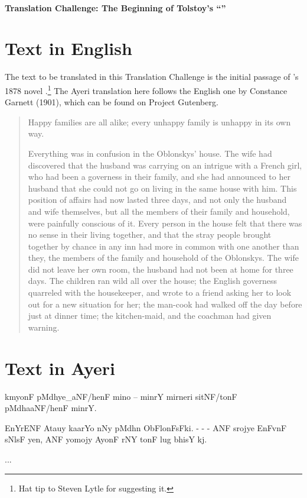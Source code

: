 \documentclass[12pt,paper=letter]{scrartcl}
\newcommand{\q}[1]{\enquote{#1}} %
\newenvironment{ayeri}{\begin{multicols}{2} \Tagati}{\end{multicols} \par}
\newenvironment{mytitle}{\begin{center} \Large \sffamily\bfseries ~\\}{\end{center}}
\begin{document}

\begin{mytitle}
    Translation Challenge: The Beginning of Tolstoy's \q{}
\end{mytitle}

\section{Text in English}

The text to be translated in this Translation Challenge is the initial passage
of \citeauthor{tolstoy}'s 1878 novel .\footnote{Hat tip to 
Steven Lytle for suggesting it.} The Ayeri translation here follows the English 
one by Constance Garnett (1901), which can be found on Project Gutenberg.

\blockcquote{tolstoy}{
\noindent Happy families are all alike; every unhappy family is unhappy in its 
own way.

Everything was in confusion in the Oblonskys’ house. The wife had discovered 
that the husband was carrying on an intrigue with a French girl, who had been a 
governess in their family, and she had announced to her husband that she could 
not go on living in the same house with him. This position of affairs had now 
lasted three days, and not only the husband and wife themselves, but all the 
members of their family and household, were painfully conscious of it. Every 
person in the house felt that there was no sense in their living together, and 
that the stray people brought together by chance in any inn had more in common 
with one another than they, the members of the family and household of the 
Oblonskys. The wife did not leave her own room, the husband had not been at 
home for three days. The children ran wild all over the house; the English 
governess quarreled with the housekeeper, and wrote to a friend asking her to 
look out for a new situation for her; the man-cook had walked off the day 
before just at dinner time; the kitchen-maid, and the coachman had given warning.
}

\section{Text in Ayeri}
\begin{ayeri}
kmyonF pMdhye\_aNF/henF mino – minrY mirneri sitNF/tonF pMdhaaNF/henF minrY.

EnYrENF Atauy kaarYo nNy pMdhn ObFlonFsFki. - - - ANF srojye EnFvnF sNlsF yen,
ANF yomojy AyonF rNY tonF lug bhisY kj.

...
\end{ayeri}
\end{document}

